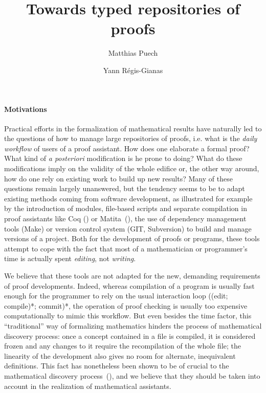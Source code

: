 \documentclass{article}
\title{Towards typed repositories of proofs}
\author{Matthias Puech \and Yann Régis-Gianas}
\date{}
\newcommand{\remplan}[1]{\noindent\textcolor{bwblue}{$\triangleright$ \textbf{#1}}}
\renewcommand{\remplan}[1]{}
\begin{document}
\maketitle

\paragraph{Motivations}

\remplan{Motivations générales}

Practical efforts in the formalization of mathematical results have
naturally led to the questions of how to manage large repositories of
proofs, i.e. what is the \emph{daily workflow} of users of a proof
assistant. How does one elaborate a formal proof? What kind of \emph{a
  posteriori} modification is he prone to doing? What do these
modifications imply on the validity of the whole edifice or, the other
way around, how do one rely on existing work to build up new results?
Many of these questions remain largely unanswered, but the tendency
seems to be to adapt existing methods coming from software
development, as illustrated for example by the introduction of
modules, file-based scripts and separate compilation in proof
assistants like \textsf{Coq} ({\cite{CoqDocWeb}}) or
\textsf{Matita}~({\cite{AspertiCTZ07}}), the use of
dependency management tools (\textsf{Make}) or version control system
(\textsf{GIT}, \textsf{Subversion}) to build and manage versions of a
project. Both for the development of proofs or programs, these tools
attempt to cope with the fact that most of a mathematician or
programmer's time is actually spent \emph{editing}, not
\emph{writing}.

We believe that these tools are not adapted for the new, demanding
requirements of proof developments. Indeed, whereas compilation of a
program is usually fast enough for the programmer to rely on the usual
interaction loop ((edit; compile)*; commit)*, the operation of proof
checking is usually too expensive computationally to mimic this
workflow. But even besides the time factor, this ``traditional'' way
of formalizing mathematics hinders the process of mathematical
discovery process: once a concept contained in a file is compiled, it
is considered frozen and any changes to it require the recompilation
of the whole file; the linearity of the development also gives no room
for alternate, inequivalent definitions. This fact has nonetheless
been shown to be of crucial to the mathematical discovery
process~(\cite{lakatos1964proofs}), and we believe that they should be
taken into account in the realization of mathematical assistants.
\end{document}
